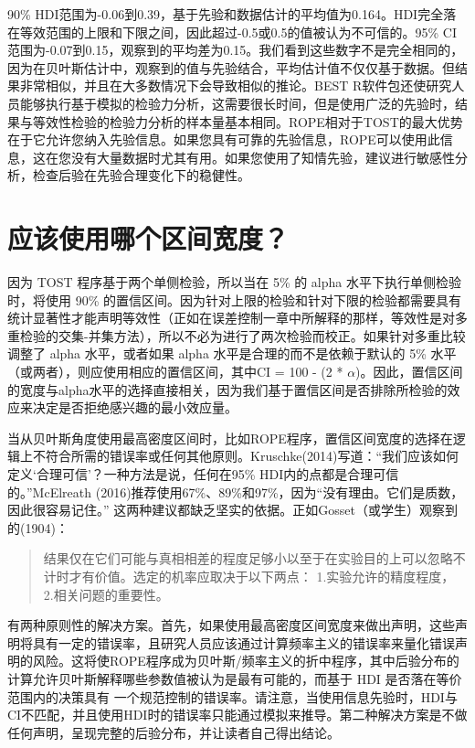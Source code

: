 \documentclass[
  letterpaper,
  DIV=11,
  numbers=noendperiod]{scrreprt}
\begin{document}
90\%
HDI范围为-0.06到0.39，基于先验和数据估计的平均值为0.164。HDI完全落在等效范围的上限和下限之间，因此超过-0.5或0.5的值被认为不可信的。95\%
CI范围为-0.07到0.15，观察到的平均差为0.15。我们看到这些数字不是完全相同的，因为在贝叶斯估计中，观察到的值与先验结合，平均估计值不仅仅基于数据。但结果非常相似，并且在大多数情况下会导致相似的推论。BEST
R软件包还使研究人员能够执行基于模拟的检验力分析，这需要很长时间，但是使用广泛的先验时，结果与等效性检验的检验力分析的样本量基本相同。ROPE相对于TOST的最大优势在于它允许您纳入先验信息。如果您具有可靠的先验信息，ROPE可以使用此信息，这在您没有大量数据时尤其有用。如果您使用了知情先验，建议进行敏感性分析，检查后验在先验合理变化下的稳健性。

\hypertarget{sec-whichinterval}{%
\section{应该使用哪个区间宽度？}\label{sec-whichinterval}}

因为 TOST 程序基于两个单侧检验，所以当在 5\% 的 alpha
水平下执行单侧检验时，将使用 90\%
的置信区间。因为针对上限的检验和针对下限的检验都需要具有统计显著性才能声明等效性（正如在误差控制一章中所解释的那样，等效性是对多重检验的交集-并集方法），所以不必为进行了两次检验而校正。如果针对多重比较调整了
alpha 水平，或者如果 alpha 水平是合理的而不是依赖于默认的 5\%
水平（或两者），则应使用相应的置信区间，其中CI = 100 - (2 *
\(\alpha\))。因此，置信区间的宽度与alpha水平的选择直接相关，因为我们基于置信区间是否排除所检验的效应来决定是否拒绝感兴趣的最小效应量。

当从贝叶斯角度使用最高密度区间时，比如ROPE程序，置信区间宽度的选择在逻辑上不符合所需的错误率或任何其他原则。Kruschke(2014)写道：``我们应该如何定义`合理可信'？一种方法是说，任何在95\%
HDI内的点都是合理可信的。''McElreath
(2016)推荐使用67\%、89\%和97\%，因为``没有理由。它们是质数，因此很容易记住。''
这两种建议都缺乏坚实的依据。正如Gosset（或学生）观察到的(1904)：

\begin{quote}
结果仅在它们可能与真相相差的程度足够小以至于在实验目的上可以忽略不计时才有价值。选定的机率应取决于以下两点：
1.实验允许的精度程度， 2.相关问题的重要性。
\end{quote}

有两种原则性的解决方案。首先，如果使用最高密度区间宽度来做出声明，这些声明将具有一定的错误率，且研究人员应该通过计算频率主义的错误率来量化错误声明的风险。这将使ROPE程序成为贝叶斯/频率主义的折中程序，其中后验分布的计算允许贝叶斯解释哪些参数值被认为是最有可能的，而基于
HDI 是否落在等价范围内的决策具有
一个规范控制的错误率。请注意，当使用信息先验时，HDI与CI不匹配，并且使用HDI时的错误率只能通过模拟来推导。第二种解决方案是不做任何声明，呈现完整的后验分布，并让读者自己得出结论。
\end{document}
